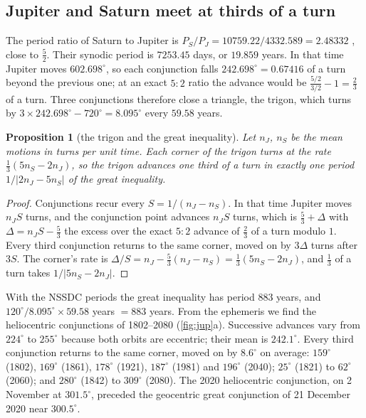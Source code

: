 \documentclass[11pt]{article}
\newtheorem{proposition}[theorem]{Proposition}
\theoremstyle{definition}\newtheorem{definition}[theorem]{Definition}
\theoremstyle{remark}\newtheorem{remark}[theorem]{Remark}
\begin{document}
\subsection{Jupiter and Saturn meet at thirds of a turn}\label{sec:trigon}
The period ratio of Saturn to Jupiter is $P_S/P_J=10759.22/4332.589=2.48332$ \cite{NSSDCJ,NSSDCS}, close to $\frac52$. Their synodic period is $7253.45$ days, or $19.859$ years. In that time Jupiter moves $602.698^\circ$, so each conjunction falls $242.698^\circ=0.67416$ of a turn beyond the previous one; at an exact $5{:}2$ ratio the advance would be $\frac{5/2}{3/2}-1=\frac23$ of a turn. Three conjunctions therefore close a triangle, the trigon, which turns by $3\times242.698^\circ-720^\circ=8.095^\circ$ every $59.58$ years.

\begin{proposition}[the trigon and the great inequality]\label{prop:trigon}
Let $n_J$, $n_S$ be the mean motions in turns per unit time. Each corner of the trigon turns at the rate $\frac13(5n_S-2n_J)$, so the trigon advances one third of a turn in exactly one period $1/|2n_J-5n_S|$ of the great inequality.
\end{proposition}
\begin{proof}
Conjunctions recur every $S=1/(n_J-n_S)$. In that time Jupiter moves $n_JS$ turns, and the conjunction point advances $n_JS$ turns, which is $\frac53+\Delta$ with $\Delta=n_JS-\frac53$ the excess over the exact $5{:}2$ advance of $\frac23$ of a turn modulo $1$. Every third conjunction returns to the same corner, moved on by $3\Delta$ turns after $3S$. The corner's rate is $\Delta/S=n_J-\frac53(n_J-n_S)=\frac13(5n_S-2n_J)$, and $\frac13$ of a turn takes $1/|5n_S-2n_J|$.
\end{proof}
With the NSSDC periods the great inequality has period $883$ years, and $120^\circ/8.095^\circ\times59.58$ years $=883$ years. From the ephemeris we find the heliocentric conjunctions of 1802--2080 (\cref{fig:jup}a). Successive advances vary from $224^\circ$ to $255^\circ$ because both orbits are eccentric; their mean is $242.1^\circ$. Every third conjunction returns to the same corner, moved on by $8.6^\circ$ on average: $159^\circ$ (1802), $169^\circ$ (1861), $178^\circ$ (1921), $187^\circ$ (1981) and $196^\circ$ (2040); $25^\circ$ (1821) to $62^\circ$ (2060); and $280^\circ$ (1842) to $309^\circ$ (2080). The 2020 heliocentric conjunction, on 2 November at $301.5^\circ$, preceded the geocentric great conjunction of 21 December 2020 near $300.5^\circ$.
\end{document}

